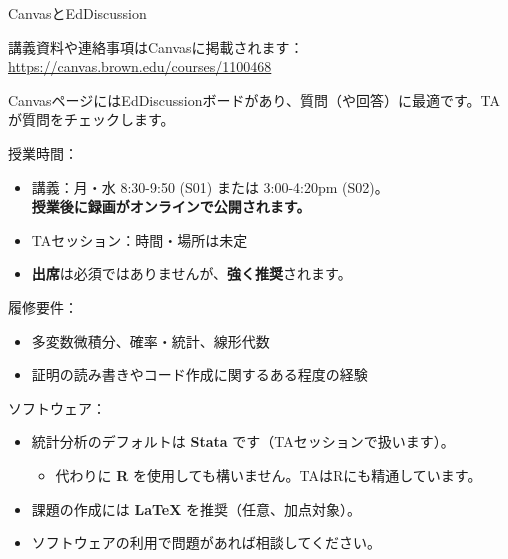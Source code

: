 \documentclass[11pt,handout]{beamer}
\begin{document}
\begin{frame}{CanvasとEdDiscussion}

講義資料や連絡事項はCanvasに掲載されます： {\url{https://canvas.brown.edu/courses/1100468}} \bigskip 

CanvasページにはEdDiscussionボードがあり、質問（や回答）に最適です。TAが質問をチェックします。

\end{frame}

\begin{frame}
\vspace{0.2cm}
授業時間：

\begin{itemize}
\item 講義：月・水 8:30-9:50 (S01) または 3:00-4:20pm (S02)。\\ \textbf{授業後に録画がオンラインで公開されます。}
\vspace{0.1cm}
\item TAセッション：時間・場所は未定


\vspace{0.1cm}
\item \textbf{出席}は必須ではありませんが、\textbf{強く推奨}されます。
\end{itemize}
\vspace{0.3cm}

\pause{}

履修要件：

\begin{itemize}
\item 多変数微積分、確率・統計、線形代数
\vspace{0.1cm}
\item 証明の読み書きやコード作成に関するある程度の経験
\end{itemize}
\vspace{0.2cm}

\pause{}

ソフトウェア：

\begin{itemize}
\item 統計分析のデフォルトは \textbf{Stata} です（TAセッションで扱います）。
	\begin{itemize}
		\item 
		代わりに \textbf{R} を使用しても構いません。TAはRにも精通しています。
	\end{itemize}
\vspace{0.1cm}
\item 課題の作成には \textbf{LaTeX} を推奨（任意、加点対象）。
\vspace{0.1cm}
\item ソフトウェアの利用で問題があれば相談してください。
\end{itemize}

\end{frame}
\end{document}
